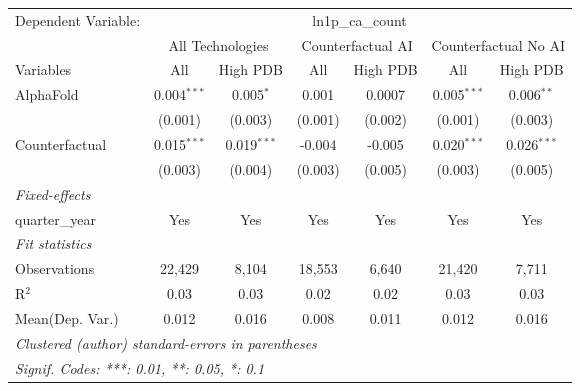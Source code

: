 \begingroup
\centering
\begin{tabular}{lcccccc}
   \tabularnewline \midrule \midrule
   Dependent Variable: & \multicolumn{6}{c}{ln1p\_ca\_count}\\
 & \multicolumn{2}{c}{All Technologies} & \multicolumn{2}{c}{Counterfactual AI} & \multicolumn{2}{c}{Counterfactual No AI} \\
\cmidrule(lr){1-1}\cmidrule(lr){2-3} \cmidrule(lr){4-5} \cmidrule(lr){6-7}
Variables & \multicolumn{1}{c}{All} & \multicolumn{1}{c}{High PDB} & \multicolumn{1}{c}{All} & \multicolumn{1}{c}{High PDB} & \multicolumn{1}{c}{All} & \multicolumn{1}{c}{High PDB} \\
\cmidrule(lr){1-1}\cmidrule(lr){2-2} \cmidrule(lr){3-3} \cmidrule(lr){4-4} \cmidrule(lr){5-5} \cmidrule(lr){6-6} \cmidrule(lr){7-7}
   AlphaFold      & 0.004$^{***}$ & 0.005$^{*}$   & 0.001   & 0.0007  & 0.005$^{***}$ & 0.006$^{**}$\\   
                  & (0.001)       & (0.003)       & (0.001) & (0.002) & (0.001)       & (0.003)\\   
   Counterfactual & 0.015$^{***}$ & 0.019$^{***}$ & -0.004  & -0.005  & 0.020$^{***}$ & 0.026$^{***}$\\   
                  & (0.003)       & (0.004)       & (0.003) & (0.005) & (0.003)       & (0.005)\\   
   \midrule
   \emph{Fixed-effects}\\
   quarter\_year  & Yes           & Yes           & Yes     & Yes     & Yes           & Yes\\  
   \midrule
   \emph{Fit statistics}\\
   Observations   & 22,429        & 8,104         & 18,553  & 6,640   & 21,420        & 7,711\\  
   R$^2$          & 0.03          & 0.03          & 0.02    & 0.02    & 0.03          & 0.03\\  
Mean(Dep. Var.) & 0.012 & 0.016 & 0.008 & 0.011 & 0.012 & 0.016 \\
   \midrule \midrule
   \multicolumn{7}{l}{\emph{Clustered (author) standard-errors in parentheses}}\\
   \multicolumn{7}{l}{\emph{Signif. Codes: ***: 0.01, **: 0.05, *: 0.1}}\\
\end{tabular}
\par\endgroup
